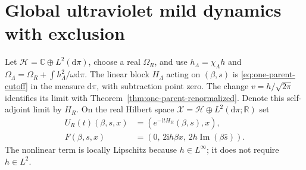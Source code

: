 \documentclass[11pt,a4paper,oneside]{book}
\theoremstyle{plain}
\theoremstyle{definition}
\theoremstyle{remark}
\newcommand{\R}{\mathbb R}
\newcommand{\C}{\mathbb C}
\newcommand{\dd}{\mathrm d}
\newcommand{\ii}{\mathrm i}
\begin{document}
\section{Global ultraviolet mild dynamics with exclusion}
\label{sec:global-collective-mild}
Let $\mathcal H=\C\oplus L^2(\dd\pi)$, choose a real $\Omega_R$, and
use $h_\Lambda=\chi_\Lambda h$ and
$\Omega_\Lambda=\Omega_R+\int h_\Lambda^2/\omega\dd\pi$.
The linear block $H_\Lambda$ acting on $(\beta,s)$ is
\eqref{eq:one-parent-cutoff} in the measure $\dd\pi$, with subtraction
point zero.  The change $v=h/\sqrt{2\pi}$ identifies its limit with
Theorem~\ref{thm:one-parent-renormalized}.  Denote this self-adjoint
limit by $H_R$.
On the real Hilbert space
$\mathcal X=\mathcal H\oplus L^2(\dd\pi;\R)$ set
\begin{equation}
 \begin{split}
 U_R(t)(\beta,s,x)&=(e^{-\ii tH_R}(\beta,s),x),\\
 F(\beta,s,x)&=(0,\,2\ii h\beta x,\,
                         2h\operatorname{Im}(\beta\bar s)).
 \end{split}
 \label{eq:collective-mild-data}
\end{equation}
The nonlinear term is locally Lipschitz because $h\in L^\infty$;
it does not require $h\in L^2$.
\end{document}
